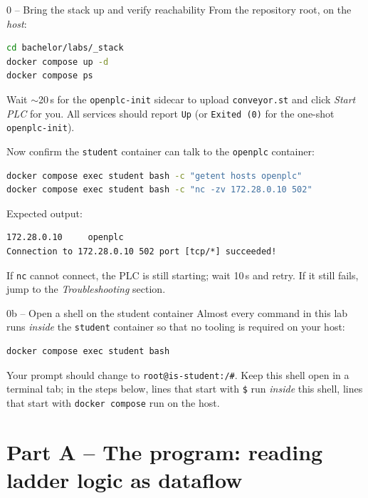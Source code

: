 \documentclass[11pt,a4paper]{article}
\begin{document}
\begin{stepbox}{0 -- Bring the stack up and verify reachability}
From the repository root, on the \emph{host}:
\begin{lstlisting}[language=bash]
cd bachelor/labs/_stack
docker compose up -d
docker compose ps
\end{lstlisting}
Wait $\sim$20\,s for the \texttt{openplc-init} sidecar to upload \texttt{conveyor.st}
and click \emph{Start PLC} for you. All services should report \texttt{Up}
(or \texttt{Exited (0)} for the one-shot \texttt{openplc-init}).

\smallskip
Now confirm the \texttt{student} container can talk to the \texttt{openplc}
container:
\begin{lstlisting}[language=bash]
docker compose exec student bash -c "getent hosts openplc"
docker compose exec student bash -c "nc -zv 172.28.0.10 502"
\end{lstlisting}
Expected output:
\begin{lstlisting}
172.28.0.10     openplc
Connection to 172.28.0.10 502 port [tcp/*] succeeded!
\end{lstlisting}
If \texttt{nc} cannot connect, the PLC is still starting; wait 10\,s and retry. If it still fails, jump to the \emph{Troubleshooting} section.
\end{stepbox}

\begin{stepbox}{0b -- Open a shell on the student container}
Almost every command in this lab runs \emph{inside} the \texttt{student} container so that no tooling is required on your host:
\begin{lstlisting}[language=bash]
docker compose exec student bash
\end{lstlisting}
Your prompt should change to \texttt{root@is-student:/\#}. Keep this shell open in a terminal tab; in the steps below, lines that start with \texttt{\$} run \emph{inside} this shell, lines that start with \texttt{docker compose} run on the host.
\end{stepbox}

\section*{Part A -- The program: reading ladder logic as dataflow}
\end{document}

